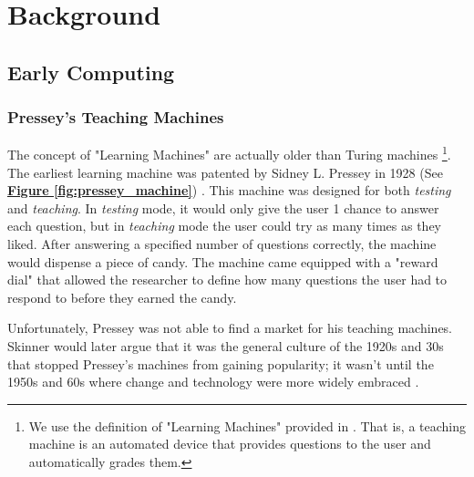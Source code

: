 \chapter{Background}
\section{Early Computing}

\subsection{Pressey's Teaching Machines}

\par The concept of "Learning Machines" are actually older than Turing machines \footnote{We use the definition of "Learning Machines" provided in \cite{benjamin1988history}. That is, a teaching machine is an automated device that provides questions to the user and automatically grades them.}. The earliest learning machine was patented by Sidney L. Pressey in 1928 (See \textbf{\hyperref[fig:pressey_machine]{Figure \ref*{fig:pressey_machine}}}) \cite{benjamin1988history}. This machine was designed for both \textit{testing} and \textit{teaching}. In \textit{testing} mode, it would only give the user 1 chance to answer each question, but in \textit{teaching} mode the user could try as many times as they liked. After answering a specified number of questions correctly, the machine would dispense a piece of candy. The machine came equipped with a "reward dial" that allowed the researcher to define how many questions the user had to respond to before they earned the candy.

\par Unfortunately, Pressey was not able to find a market for his teaching machines. Skinner would later argue that it was the general culture of the 1920s and 30s that stopped Pressey's machines from gaining popularity; it wasn't until the 1950s and 60s where change and technology were more widely embraced \cite{skinner1958teaching}.

